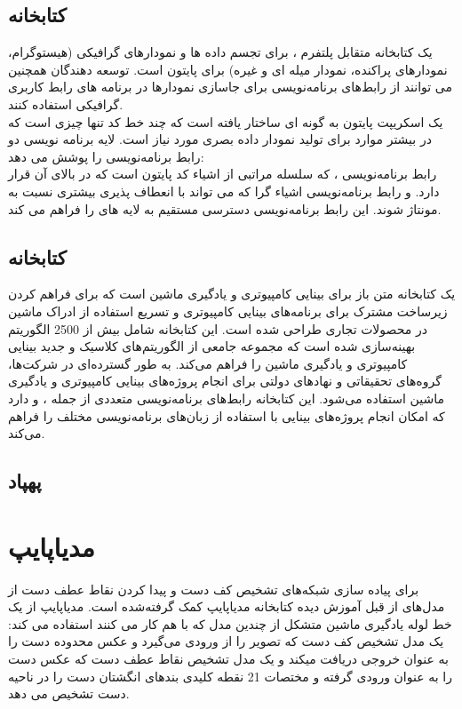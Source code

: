 \subsection{کتابخانه }
 یک کتابخانه متقابل پلتفرم ، برای تجسم داده ها و نمودارهای گرافیکی (هیستوگرام، نمودارهای پراکنده، نمودار میله ای و غیره) برای 
پایتون است. توسعه دهندگان همچنین می توانند از رابط‌های برنامه‌نویسی   برای جاسازی نمودارها در برنامه های رابط کاربری گرافیکی استفاده کنند.
\\
یک اسکریپت  پایتون به گونه ای ساختار یافته است که چند خط کد تنها چیزی است که در بیشتر موارد برای تولید نمودار داده بصری مورد نیاز است. لایه برنامه نویسی  دو رابط برنامه‌نویسی را پوشش می دهد:
\\
رابط برنامه‌نویسی ، که سلسله مراتبی از اشیاء کد پایتون است که در بالای آن  قرار دارد. و رابط برنامه‌نویسی اشیاء گرا  که می تواند 
با انعطاف پذیری بیشتری نسبت به  مونتاژ شوند. این رابط برنامه‌نویسی دسترسی مستقیم به لایه های  را فراهم می کند.

\subsection{کتابخانه }
 یک کتابخانه متن باز برای بینایی کامپیوتری و یادگیری ماشین است که برای فراهم کردن زیرساخت مشترک برای برنامه‌های بینایی کامپیوتری و تسریع استفاده از ادراک ماشین در محصولات
تجاری طراحی شده است. این کتابخانه شامل بیش از 2500 الگوریتم بهینه‌سازی شده است که مجموعه جامعی از الگوریتم‌های کلاسیک و جدید بینایی کامپیوتری و یادگیری ماشین 
را فراهم می‌کند.  به طور گسترده‌ای در شرکت‌ها، گروه‌های تحقیقاتی و نهادهای دولتی برای انجام پروژه‌های بینایی کامپیوتری و یادگیری ماشین استفاده می‌شود. این کتابخانه رابط‌های برنامه‌نویسی 
متعددی از جمله ،   و  دارد که امکان انجام پروژه‌های بینایی با استفاده از زبان‌های برنامه‌نویسی مختلف را فراهم می‌کند.

\subsection{پهپاد }


\section{مدیاپایپ}
برای پیاده سازی شبکه‌های تشخیص کف دست و پیدا کردن نقاط عطف دست از مدل‌های از قبل آموزش دیده کتابخانه مدیاپایپ کمک گرفته‌شده است. مدیاپایپ  از یک خط لوله
یادگیری ماشین متشکل از چندین مدل که با هم کار می کنند استفاده می کند: یک مدل تشخیص کف دست 
که تصویر را از ورودی می‌گیرد و  عکس محدوده دست را به عنوان خروجی دریافت میکند و یک مدل تشخیص نقاط عطف دست 
که عکس دست را به عنوان ورودی گرفته و مختصات‌ 21 نقطه کلیدی بند‌های انگشتان دست را در ناحیه دست تشخیص می دهد.

